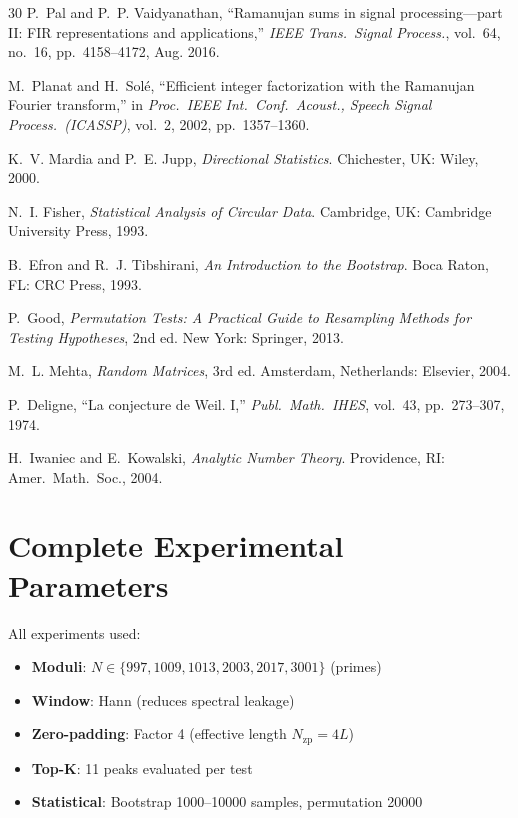 \documentclass[10pt,twocolumn]{article}
\begin{document}
\begin{thebibliography}{30}
P.~Pal and P.~P. Vaidyanathan, ``Ramanujan sums in signal processing---part II: FIR representations and applications,'' \emph{IEEE Trans.\ Signal Process.}, vol.~64, no.~16, pp.~4158--4172, Aug. 2016.

M.~Planat and H.~Solé, ``Efficient integer factorization with the Ramanujan Fourier transform,'' in \emph{Proc.\ IEEE Int.\ Conf.\ Acoust., Speech Signal Process.\ (ICASSP)}, vol.~2, 2002, pp.~1357--1360.

K.~V. Mardia and P.~E. Jupp, \emph{Directional Statistics}. Chichester, UK: Wiley, 2000.

N.~I. Fisher, \emph{Statistical Analysis of Circular Data}. Cambridge, UK: Cambridge University Press, 1993.

B.~Efron and R.~J. Tibshirani, \emph{An Introduction to the Bootstrap}. Boca Raton, FL: CRC Press, 1993.

P.~Good, \emph{Permutation Tests: A Practical Guide to Resampling Methods for Testing Hypotheses}, 2nd ed. New York: Springer, 2013.

M.~L. Mehta, \emph{Random Matrices}, 3rd ed. Amsterdam, Netherlands: Elsevier, 2004.

P.~Deligne, ``La conjecture de Weil. I,'' \emph{Publ.\ Math.\ IHES}, vol.~43, pp.~273--307, 1974.

H.~Iwaniec and E.~Kowalski, \emph{Analytic Number Theory}. Providence, RI: Amer.\ Math.\ Soc., 2004.

\end{thebibliography}

\appendix

\section{Complete Experimental Parameters}

All experiments used:
\begin{itemize}
\item \textbf{Moduli}: $N \in \{997, 1009, 1013, 2003, 2017, 3001\}$ (primes)
\item \textbf{Window}: Hann (reduces spectral leakage)
\item \textbf{Zero-padding}: Factor 4 (effective length $N_{\text{zp}} = 4L$)
\item \textbf{Top-K}: 11 peaks evaluated per test
\item \textbf{Statistical}: Bootstrap 1000--10000 samples, permutation 20000
\end{itemize}
\end{document}
